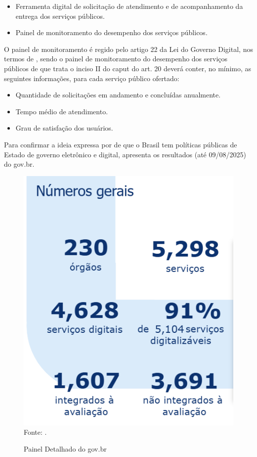 \begin{itemize}
    \item Ferramenta digital de solicitação de atendimento e de acompanhamento da entrega dos serviços públicos.
    \item Painel de monitoramento do desempenho dos serviços públicos.
\end{itemize}

O painel de monitoramento é regido pelo artigo 22 da Lei do Governo Digital, nos termos de \cite{l14129}, sendo o painel de monitoramento do desempenho dos serviços públicos de que trata o inciso II do caput do art. 20 deverá conter, no mínimo, as seguintes informações, para cada serviço público ofertado:

\begin{itemize}
    \item Quantidade de solicitações em andamento e concluídas anualmente.
    \item Tempo médio de atendimento.
    \item Grau de satisfação dos usuários.
\end{itemize}

Para confirmar a ideia expressa por \cite{mitkiewicz2024transformaccao} de que o Brasil tem políticas públicas de Estado de governo eletrônico e digital, \cite{painel_completo_monitoramento_govbr} apresenta os resultados (até 09/08/2025) do gov.br.

\begin{figure}[H]
    \centering
    \caption{Painel Detalhado do gov.br}
    \includegraphics[width=0.5\linewidth]{figuras/painel_govbr.PNG}
    \label{fig:painel_govbr}
    \\ \footnotesize{Fonte: \cite{painel_completo_monitoramento_govbr}.}
\end{figure}


